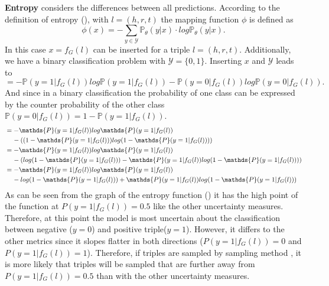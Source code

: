 \textbf{Entropy} 
considers the differences between all predictions.
According to the definition of entropy (), with $l = (h,r,t)$ the mapping function $\phi$ is defined as
\begin{equation}
    \phi(x) = - \sum_{y \in \mathcal{Y}}{\mathds{P}_{\theta}(y | x) \cdot log \mathds{P}_{\theta}(y | x)}.
\end{equation}
In this case $x = f_G(l)$ can be inserted for a triple $l = (h,r,t)$.
Additionally, we have a binary classification problem with $\mathcal{Y} = \{0,1\}$.
Inserting $x$ and $\mathcal{Y}$ leads to
\begin{equation}
= - \mathds{P}(y = 1| f_G(l)) log \mathds{P}(y = 1 | f_G(l))
- \mathds{P}(y = 0| f_G(l)) log \mathds{P}(y = 0 | f_G(l)).
\end{equation}
And since in a binary classification the probability of one class can be expressed by the counter probability of the other class 
$\mathds{P}(y = 0| f_G(l)) = 1 - \mathds{P}(y = 1 | f_G(l))$.
\begin{align*} 
&= - \mathds{P}(y = 1| f_G(l)) log \mathds{P}(y = 1 | f_G(l))\\
  &\hspace{4mm}- ((1 - \mathds{P}(y = 1 | f_G(l))) log(1 - \mathds{P}(y = 1 | f_G(l)))) \\
&= - \mathds{P}(y = 1| f_G(l)) log \mathds{P}(y = 1 | f_G(l)) \\
   &\hspace{4mm}- (log(1 - \mathds{P}(y = 1 | f_G(l))) - \mathds{P}(y = 1 | f_G(l)) log(1 - \mathds{P}(y = 1 | f_G(l)))) \\
&= - \mathds{P}(y = 1| f_G(l)) log \mathds{P}(y = 1 | f_G(l)) \\
   &\hspace{4mm}- log(1 - \mathds{P}(y = 1 | f_G(l))) + \mathds{P}(y = 1 | f_G(l)) log(1 - \mathds{P}(y = 1 | f_G(l))) 
\end{align*}
As can be seen from the graph of the entropy function () it has the high point of the function at $P(y = 1 | f_G(l)) = 0.5$ like the other uncertainty measures.
Therefore, at this point the model is most uncertain about the classification between negative ($y = 0$) and positive triple($y = 1$).
However, it differs to the other metrics since it slopes flatter in both directions ($P(y = 1 | f_G(l)) = 0$ and $P(y = 1 | f_G(l)) = 1$).
Therefore, if triples are sampled by sampling method \ussoftmax, it is more likely that triples will be sampled that are further away from $P(y = 1 | f_G(l)) = 0.5$ than with the other uncertainty measures.

